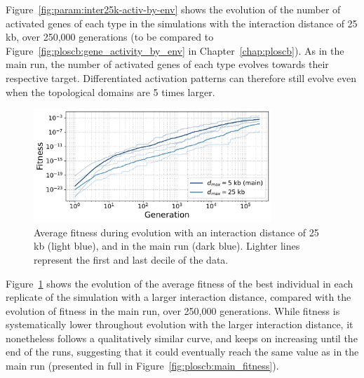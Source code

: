 Figure~\ref{fig:param:inter25k-activ-by-env} shows the evolution of the number of activated genes of each type in the simulations with the interaction distance of 25 kb, over 250,000 generations (to be compared to Figure~\ref{fig:ploscb:gene_activity_by_env} in Chapter~\ref{chap:ploscb}).
As in the main run, the number of activated genes of each type evolves towards their respective target.
Differentiated activation patterns can therefore still evolve even when the topological domains are 5 times larger.

\begin{figure}[H]
\centering
\includegraphics[width=0.8\textwidth]{param/interaction-25k/fitness_all_with_main.pdf}
\caption[Average fitness during evolution, with an interaction distance of 25 kb]{Average fitness during evolution with an interaction distance of 25 kb (light blue), and in the main run (dark blue).
Lighter lines represent the first and last decile of the data.}
\label{fig:param:inter25k-fitness}
\end{figure}

Figure~\ref{fig:param:inter25k-fitness} shows the evolution of the average fitness of the best individual in each replicate of the simulation with a larger interaction distance, compared with the evolution of fitness in the main run, over 250,000 generations.
While fitness is systematically lower throughout evolution with the larger interaction distance, it nonetheless follows a qualitatively similar curve, and keeps on increasing until the end of the runs, suggesting that it could eventually reach the same value as in the main run (presented in full in Figure~\ref{fig:ploscb:main_fitness}).

